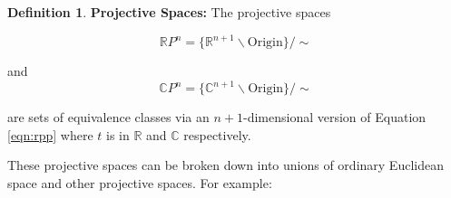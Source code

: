 \documentclass{article}
\theoremstyle{definition}
\newtheorem{definition}{Definition}[section]
\begin{document}
\begin{definition} {\bf Projective Spaces:} The projective spaces 

\begin{equation*}
\mathbb{R}P^n = \{\mathbb{R}^{n+1} \backslash \text{Origin}\} / \sim 
\end{equation*}

and
\begin{equation*}
\mathbb{C}P^n = \{\mathbb{C}^{n+1} \backslash \text{Origin}\} / \sim 
\end{equation*}

\bigskip
\noindent
are sets of equivalence classes via an $n + 1$-dimensional version of
Equation \ref{eqn:rpp} where $t$ is in $\mathbb{R}$ and $\mathbb{C}$ 
respectively.
\end{definition}

\bigskip
\noindent
These projective spaces can be broken down into unions of ordinary Euclidean space and other projective spaces. For example:
\end{document}
